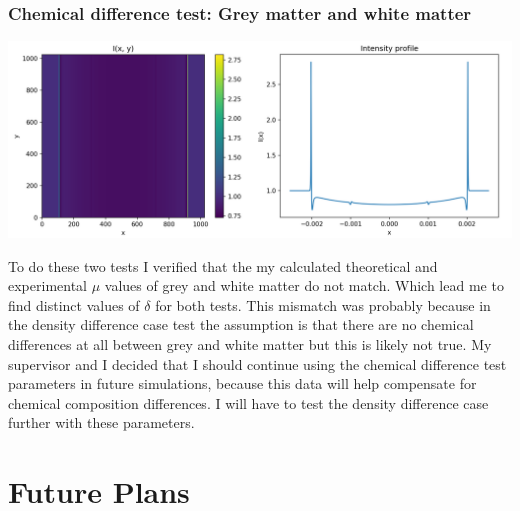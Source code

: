 \documentclass[9pt, a4paper]{article}
\newenvironment{Figure}
    {\par\medskip\noindent\minipage{\linewidth}}
    {\endminipage\par\medskip}
\begin{document}
\subsubsection{Chemical difference test: Grey matter and white matter}
\begin{Figure}
\centering
\includegraphics[width=\linewidth]{optimistic_case.pdf}
\end{Figure}

To do these two tests I verified that the my calculated theoretical and experimental $\mu$ values of grey and white matter do not match. Which lead me to find distinct values of $\delta$ for both tests. This mismatch was probably because in the density difference case test the assumption is that there are no chemical differences at all between grey and white matter but this is likely not true. 
My supervisor and I decided that I should continue using the chemical difference test parameters in future simulations, because this data will help compensate for chemical composition differences. I will have to test the density difference case further with these parameters.

\section{Future Plans}
\end{document}
